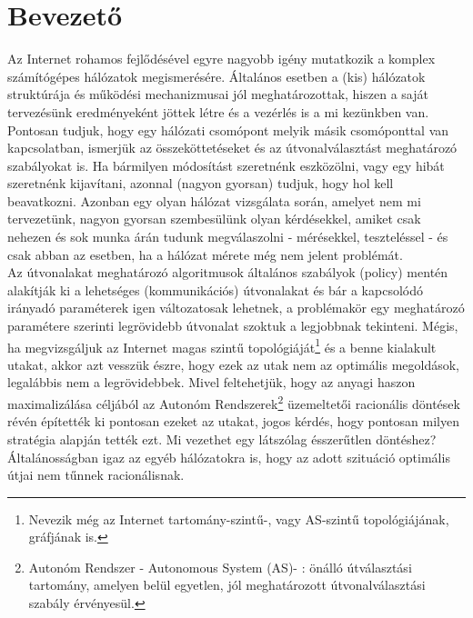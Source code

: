\chapter*{Bevezető}

Az Internet rohamos fejlődésével egyre nagyobb igény mutatkozik a komplex számítógépes hálózatok megismerésére. Általános esetben a (kis) hálózatok struktúrája és működési mechanizmusai jól meghatározottak, hiszen a saját tervezésünk eredményeként jöttek létre és a vezérlés is a mi kezünkben van. Pontosan tudjuk, hogy egy hálózati csomópont melyik másik csomóponttal van kapcsolatban, ismerjük az összeköttetéseket és az útvonalválasztást meghatározó szabályokat is. Ha bármilyen módosítást szeretnénk eszközölni, vagy egy hibát szeretnénk kijavítani, azonnal (nagyon gyorsan) tudjuk, hogy hol kell beavatkozni.
Azonban egy olyan hálózat vizsgálata során, amelyet nem mi tervezetünk, nagyon gyorsan szembesülünk olyan kérdésekkel, amiket csak nehezen és sok munka árán tudunk megválaszolni - mérésekkel, teszteléssel - és csak abban az esetben, ha a hálózat mérete még nem jelent problémát.\\

Az útvonalakat meghatározó algoritmusok általános szabályok (policy) mentén alakítják ki a lehetséges (kommunikációs) útvonalakat és bár a kapcsolódó irányadó paraméterek igen változatosak lehetnek, a problémakör egy meghatározó paramétere szerinti legrövidebb útvonalat szoktuk a legjobbnak tekinteni. Mégis, ha megvizsgáljuk az Internet magas szintű topológiáját\footnote{Nevezik még az Internet tartomány-szintű-, vagy AS-szintű topológiájának, gráfjának is.} és a benne kialakult utakat, akkor azt vesszük észre, hogy ezek az utak nem az optimális megoldások, legalábbis nem a legrövidebbek. Mivel feltehetjük, hogy az anyagi haszon maximalizálása céljából az Autonóm Rendszerek\footnote{Autonóm Rendszer - Autonomous System (AS)- : önálló útválasztási tartomány, amelyen belül egyetlen, jól meghatározott útvonalválasztási szabály érvényesül.} üzemeltetői racionális döntések révén építették ki pontosan ezeket az utakat, jogos kérdés, hogy pontosan milyen stratégia alapján tették ezt. Mi vezethet egy látszólag ésszerűtlen döntéshez? Általánosságban igaz az egyéb hálózatokra is, hogy az adott szituáció optimális útjai nem tűnnek racionálisnak.\\

